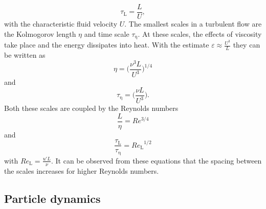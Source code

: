 \documentclass[11pt,a4paper,openany,oneside,parskip=half*]{article}
\begin{document}
\begin{equation}
\tau_\mathrm{L} = \frac{L}{U},
\end{equation}
with the characteristic fluid velocity $U$.
\newline
The smallest scales in a turbulent flow are the Kolmogorov length $\eta$ and time scale $\tau_\mathrm{\eta}$. At these scales, the effects of viscosity take place and the energy dissipates into heat. With the estimate $\varepsilon \approx \frac{U^3}{L} $ they can be written as
\begin{equation}
\eta = \biggl (\frac{\nu^3 L}{U^3} \biggl )^{1/4}
\end{equation}
and
\begin{equation}
\tau_\mathrm{\eta} = \biggl (\frac{\nu L}{U^3} \biggl ).
\end{equation}
Both these scales are coupled by the Reynolds numbers
\begin{equation}
\frac{L}{\eta} = Re^{3/4}
\end{equation}
and
\begin{equation}
\frac{\tau_\mathrm{L}}{\tau_\mathrm{\eta}} = {Re_\mathrm{L}}^{1/2}
\end{equation}
with $Re_\mathrm{L} = \frac{u' L}{\nu}$.
It can be observed from these equations that the spacing between the scales increases for higher Reynolds numbers. 
\newline
\subsection{Particle dynamics} %
\end{document}
